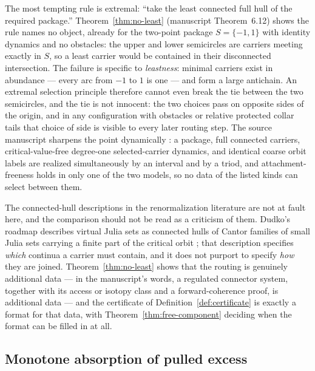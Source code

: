 \documentclass[11pt,reqno]{amsart}
\theoremstyle{definition}
\theoremstyle{remark}
\begin{document}
The most tempting rule is extremal: ``take the least connected full hull
of the required package.''  Theorem~\ref{thm:no-least} (manuscript
Theorem~6.12) shows the rule names no object, already for the two-point
package $S=\{-1,1\}$ with identity dynamics and no obstacles: the upper
and lower semicircles are carriers meeting exactly in $S$, so a least
carrier would be contained in their disconnected intersection.  The
failure is specific to \emph{leastness}: minimal carriers exist in
abundance --- every arc from $-1$ to $1$ is one --- and form a large
antichain.  An extremal selection principle therefore cannot even break
the tie between the two semicircles, and the tie is not innocent: the two
choices pass on opposite sides of the origin, and in any configuration
with obstacles or relative protected collar tails that choice of side is visible to
every later routing step.  The source manuscript sharpens the point
dynamically \cite[Proposition~6.11]{MWman}: a package, full connected
carriers, critical-value-free degree-one selected-carrier dynamics, and
identical coarse orbit labels are realized simultaneously by an interval
and by a triod, and attachment-freeness holds in only one of the two
models, so no data of the listed kinds can select between them.

The connected-hull descriptions in the renormalization
literature are not at fault here, and the comparison should not be read
as a criticism of them.  Dudko's roadmap describes virtual Julia sets as
connected hulls of Cantor families of small Julia sets carrying a finite
part of the critical orbit \cite{Dud25}; that description specifies
\emph{which} continua a carrier must contain, and it does not purport to
specify \emph{how} they are joined.  Theorem~\ref{thm:no-least} shows
that the routing is genuinely additional data --- in the manuscript's
words, a regulated connector system, together with its access or isotopy
class and a forward-coherence proof, is additional data \cite{MWman} ---
and the certificate of Definition~\ref{def:certificate} is exactly a
format for that data, with Theorem~\ref{thm:free-component} deciding when
the format can be filled in at all.

\subsection{Monotone absorption of pulled excess}
\label{subsec:A-comp-absorption}
\end{document}

